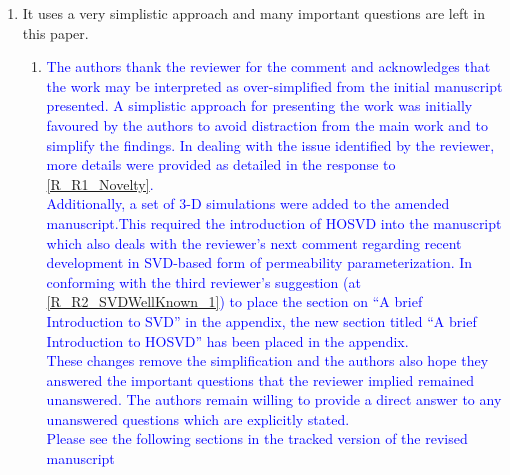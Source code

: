 \documentclass[11pt]{letter} %
\newcommand{\blue}{\textcolor{blue}}
\begin{document}
\begin{letter}
{\begin{enumerate}
\begin{enumerate}
\begin{enumerate}
   \begin{enumerate}
 \item \blue{Manuscipt Topic}
\item \blue{Abstract}
\item \blue{Section 1 Introduction}
\item \blue{Section 2.2 PCA, SVD, POD, KLT and Reservoir Characterisation}
\item \blue{4.1.3. Understanding the principal component spaces}
\item \blue{4.1.3. Reduced Order Model/Principal Component Space Reduction}
\item \blue{Figure 2}
   \end{enumerate}
      \end{enumerate}
    \item \label{R_R1_OverSimplification} It uses a very simplistic approach and many important questions are left in this paper.
      \begin{enumerate}
      \item \label{R_R1_OverSimplification_P1} \blue{The authors thank the reviewer for the comment and acknowledges that the work may be interpreted as over-simplified from the initial manuscript presented. A simplistic approach for presenting the work was initially favoured by the authors to avoid distraction from the main work and to simplify the findings. In dealing with the issue identified by the reviewer, more details were provided as detailed in the response to \ref{R_R1_Novelty}.\\
        Additionally, a set of 3-D simulations were added to the amended manuscript.This required the introduction of HOSVD into the manuscript which also deals with the reviewer's next comment regarding recent development in SVD-based form of permeability parameterization. In conforming with the third reviewer's suggestion (at \ref{R_R2_SVDWellKnown_1}) to place the section on ``A brief Introduction to SVD'' in the appendix, the new section titled ``A brief Introduction to HOSVD'' has been placed in the appendix. \\
        These changes remove the simplification and the authors also hope they answered the important questions that the reviewer implied remained unanswered. The authors remain willing to provide a direct answer to any unanswered questions which are explicitly stated.}\\
        \blue{Please see the following sections in the tracked version of the revised manuscript}
   \begin{enumerate}

\end{enumerate}
\end{enumerate}
\end{enumerate}
\end{enumerate}}
\end{letter}
\end{document}

